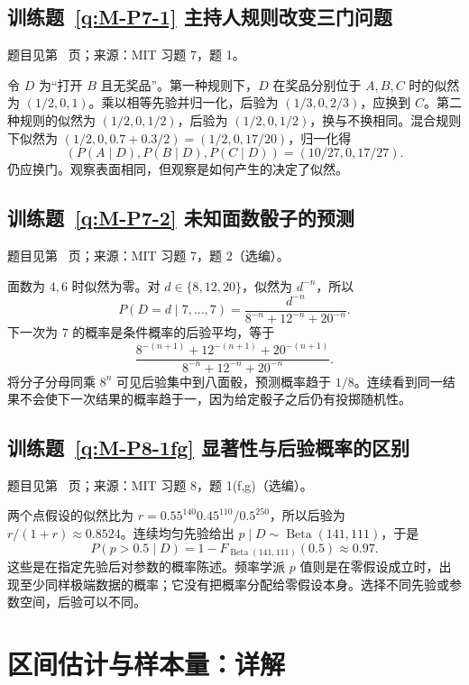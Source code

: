 \documentclass[UTF8,12pt,a4paper,fontset=fandol]{ctexbook}
\begin{document}
\subsection*{训练题~\ref{q:M-P7-1} 主持人规则改变三门问题}\label{a:M-P7-1}{\small 题目见第~\pageref{q:M-P7-1} 页；来源：MIT 习题 7，题 1。}
\begin{solve}令 $D$ 为“打开 $B$ 且无奖品”。第一种规则下，$D$ 在奖品分别位于 $A,B,C$ 时的似然为 $(1/2,0,1)$。乘以相等先验并归一化，后验为 $(1/3,0,2/3)$，应换到 $C$。第二种规则的似然为 $(1/2,0,1/2)$，后验为 $(1/2,0,1/2)$，换与不换相同。混合规则下似然为 $(1/2,0,0.7+0.3/2)=(1/2,0,17/20)$，归一化得\[(P(A\mid D),P(B\mid D),P(C\mid D))=(10/27,0,17/27).\]仍应换门。观察表面相同，但观察是如何产生的决定了似然。\end{solve}

\subsection*{训练题~\ref{q:M-P7-2} 未知面数骰子的预测}\label{a:M-P7-2}{\small 题目见第~\pageref{q:M-P7-2} 页；来源：MIT 习题 7，题 2（选编）。}
\begin{solve}面数为 $4,6$ 时似然为零。对 $d\in\{8,12,20\}$，似然为 $d^{-n}$，所以\[P(D=d\mid7,\ldots,7)=\frac{d^{-n}}{8^{-n}+12^{-n}+20^{-n}}.\]下一次为 $7$ 的概率是条件概率的后验平均，等于\[\frac{8^{-(n+1)}+12^{-(n+1)}+20^{-(n+1)}}{8^{-n}+12^{-n}+20^{-n}}.\]将分子分母同乘 $8^n$ 可见后验集中到八面骰，预测概率趋于 $1/8$。连续看到同一结果不会使下一次结果的概率趋于一，因为给定骰子之后仍有投掷随机性。\end{solve}

\subsection*{训练题~\ref{q:M-P8-1fg} 显著性与后验概率的区别}\label{a:M-P8-1fg}{\small 题目见第~\pageref{q:M-P8-1fg} 页；来源：MIT 习题 8，题 1(f,g)（选编）。}
\begin{solve}两个点假设的似然比为 $r=0.55^{140}0.45^{110}/0.5^{250}$，所以后验为 $r/(1+r)\approx0.8524$。连续均匀先验给出 $p\mid D\sim\operatorname{Beta}(141,111)$，于是\[P(p>0.5\mid D)=1-F_{\operatorname{Beta}(141,111)}(0.5)\approx0.97.\]这些是在指定先验后对参数的概率陈述。频率学派 $p$ 值则是在零假设成立时，出现至少同样极端数据的概率；它没有把概率分配给零假设本身。选择不同先验或参数空间，后验可以不同。\end{solve}

\clearpage\section*{区间估计与样本量：详解}
\end{document}
